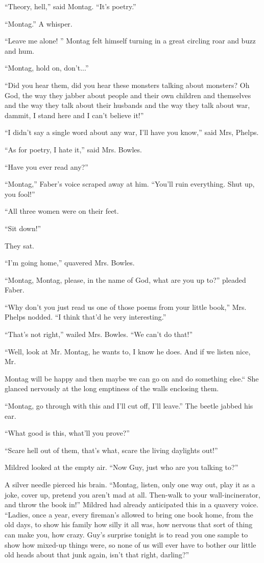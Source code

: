 \documentclass[11pt,openany]{book}
\begin{document}
``Theory, hell,'' said Montag. ``It's poetry.''

``Montag.'' A whisper.

``Leave me alone! '' Montag felt himself turning in a great circling roar and buzz and hum.

``Montag, hold on, don't...''

``Did you hear them, did you hear these monsters talking about monsters? Oh God, the way they jabber about people and their own children and themselves and the way they talk about their husbands and the way they talk about war, dammit, I stand here and I can't believe it!''

``I didn't say a single word about any war, I'll have you know,'' said Mrs, Phelps.

``As for poetry, I hate it,'' said Mrs. Bowles.

``Have you ever read any?''

``Montag,'' Faber's voice scraped away at him. ``You'll ruin everything. Shut up, you fool!''

``All three women were on their feet.

``Sit down!''

They sat.

``I'm going home,'' quavered Mrs. Bowles.

``Montag, Montag, please, in the name of God, what are you up to?'' pleaded Faber.

``Why don't you just read us one of those poems from your little book,'' Mrs. Phelps nodded. ``I think that'd he very interesting.''

``That's not right,'' wailed Mrs. Bowles. ``We can't do that!''

``Well, look at Mr. Montag, he wants to, I know he does. And if we listen nice, Mr.

Montag will be happy and then maybe we can go on and do something else.`` She glanced nervously at the long emptiness of the walls enclosing them.

``Montag, go through with this and I'll cut off, I'll leave.'' The beetle jabbed his ear.

``What good is this, what'll you prove?''

``Scare hell out of them, that's what, scare the living daylights out!''

Mildred looked at the empty air. ``Now Guy, just who are you talking to?''

A silver needle pierced his brain. ``Montag, listen, only one way out, play it as a joke, cover up, pretend you aren't mad at all. Then-walk to your wall-incinerator, and throw the book in!'' Mildred had already anticipated this in a quavery voice. ``Ladies, once a year, every fireman's allowed to bring one book home, from the old days, to show his family how silly it all was, how nervous that sort of thing can make you, how crazy. Guy's surprise tonight is to read you one sample to show how mixed-up things were, so none of us will ever have to bother our little old heads about that junk again, isn't that right, darling?''
\end{document}
